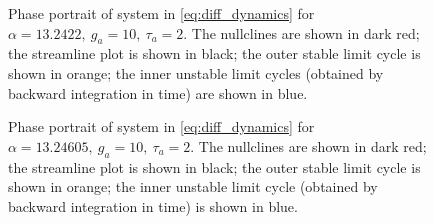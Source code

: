 \begin{figure}[!h]
        \caption{\label{fig:eq2D_cycle_homoclinic} Phase portrait of system in \eqref{eq:diff_dynamics} for $\alpha=13.2422,\ g_a=10,\ \tau_a=2$. The nullclines are shown in dark red; the streamline plot is shown in black; the outer stable limit cycle is shown in orange; the inner unstable limit cycles (obtained by backward integration in time) are shown in blue.}
\end{figure}

\begin{figure}[!h]
        \caption{\label{fig:eq2D_cycle_before_collapse} Phase portrait of system in \eqref{eq:diff_dynamics} for $\alpha=13.24605,\ g_a=10,\ \tau_a=2$. The nullclines are shown in dark red; the streamline plot is shown in black; the outer stable limit cycle is shown in orange; the inner unstable limit cycle (obtained by backward integration in time) is shown in blue.}
\end{figure}


